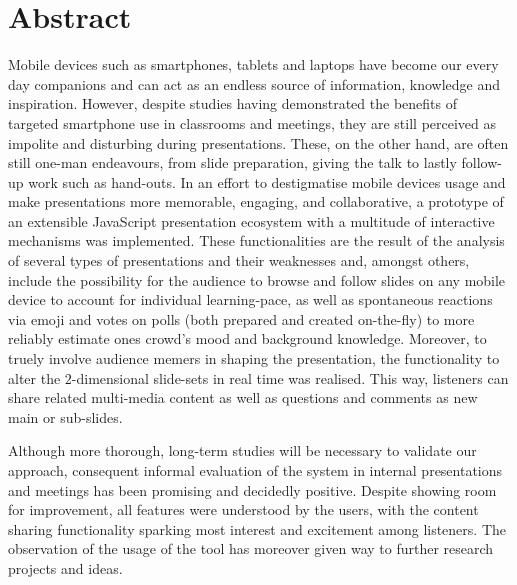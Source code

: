 \chapter{Abstract}
Mobile devices such as smartphones, tablets and laptops have become our every day companions and can act as an endless source of information, knowledge and inspiration. However, despite studies having demonstrated the benefits of targeted smartphone use in classrooms and meetings, they are still perceived as impolite and disturbing during presentations. These, on the other hand, are often still one-man endeavours, from slide preparation, giving the talk to lastly follow-up work such as hand-outs. In an effort to destigmatise mobile devices usage and make presentations more memorable, engaging, and collaborative, a prototype of an extensible JavaScript presentation eco\-system with a multitude of interactive mechanisms was implemented. These functionalities are the result of the analysis of several types of presentations and their weaknesses and, amongst others, include the possibility for the audience to browse and follow slides on any mobile device to account for individual learning-pace, as well as spontaneous reactions via emoji and votes on polls (both prepared and created on-the-fly) to more reliably estimate ones crowd's mood and background knowledge. Moreover, to truely involve audience memers in shaping the presentation, the functionality to alter the $2$-dimensional slide-sets in real time was realised. This way, listeners can share related multi-media content as well as questions and comments as new main or sub-slides.

Although more thorough, long-term studies will be necessary to validate our approach, consequent informal evaluation of the system in internal presentations and meetings has been promising and decidedly positive. Despite showing room for improvement, all features were understood by the users, with the content sharing functionality sparking most interest and excitement among listeners. The observation of the usage of the tool has moreover given way to further research projects and ideas. 